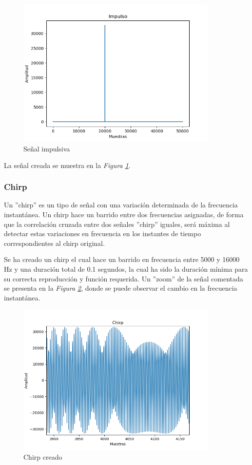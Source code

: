 \documentclass[a4paper,11pt]{book}
\begin{document}
\begin{figure}[hbtp]
\centering
\includegraphics[width = 10cm]{FIGURAS/impulso.png}
\caption{Señal impulsiva}
\label{impulso}
\end{figure}


La señal creada se muestra en la \textit{Figura \ref{impulso}}.

\subsubsection{Chirp}
Un ''chirp'' es un tipo de señal con una variación determinada de la frecuencia instantánea. Un chirp hace un barrido entre dos frecuencias asignadas, de forma que la correlación cruzada entre dos señales ''chirp'' iguales, será máxima al detectar estas variaciones en frecuencia en los instantes de tiempo correspondientes al chirp original.

Se ha creado un chirp el cual hace un barrido en frecuencia entre 5000 y 16000 Hz y una duración total de 0.1 segundos, la cual ha sido la duración mínima para su correcta reproducción y función requerida. Un ''zoom'' de la señal comentada se presenta en la \textit{Figura \ref{chirp}}, donde se puede observar el cambio en la frecuencia instantánea.

\begin{figure}[hbtp]
\centering
\includegraphics[width = 10cm]{FIGURAS/chiirp.png}
\caption{Chirp creado}
\label{chirp}
\end{figure}
\end{document}
